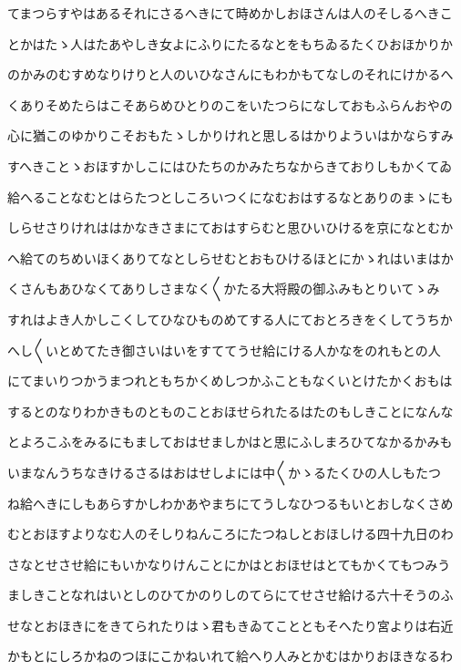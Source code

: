 \documentclass[a4paper,11pt,landscape]{ltjtarticle}
\begin{document}
てまつらすやはあるそれにさるへきにて時めかしおほさんは人のそしるへきこ
\par\medskip
とかはたゝ人はたあやしき女よにふりにたるなとをもちゐるたくひおほかりか
\par\medskip
のかみのむすめなりけりと人のいひなさんにもわかもてなしのそれにけかるへ
\par\medskip
くありそめたらはこそあらめひとりのこをいたつらになしておもふらんおやの
\par\medskip
心に猶このゆかりこそおもたゝしかりけれと思しるはかりよういはかならすみ
\par\medskip
すへきことゝおほすかしこにはひたちのかみたちなからきておりしもかくてゐ
\par\medskip
給へることなむとはらたつとしころいつくになむおはするなとありのまゝにも
\par\medskip
しらせさりけれははかなきさまにておはすらむと思ひいひけるを京になとむか
\par\medskip
へ給てのちめいほくありてなとしらせむとおもひけるほとにかゝれはいまはか
\par\medskip
くさんもあひなくてありしさまなく〱かたる大将殿の御ふみもとりいてゝみ
\par\medskip
すれはよき人かしこくしてひなひものめてする人にておとろきをくしてうちか
\par\medskip
へし〱いとめてたき御さいはいをすててうせ給にける人かなをのれもとの人
\par\medskip
にてまいりつかうまつれともちかくめしつかふこともなくいとけたかくおもは
\par\medskip
するとのなりわかきものとものことおほせられたるはたのもしきことになんな
\par\medskip
とよろこふをみるにもましておはせましかはと思にふしまろひてなかるかみも
\par\medskip
いまなんうちなきけるさるはおはせしよには中〱かゝるたくひの人しもたつ
\par\medskip
ね給へきにしもあらすかしわかあやまちにてうしなひつるもいとおしなくさめ
\par\medskip
むとおほすよりなむ人のそしりねんころにたつねしとおほしける四十九日のわ
\par\medskip
さなとせさせ給にもいかなりけんことにかはとおほせはとてもかくてもつみう
\par\medskip
ましきことなれはいとしのひてかのりしのてらにてせさせ給ける六十そうのふ
\par\medskip
せなとおほきにをきてられたりはゝ君もきゐてことともそへたり宮よりは右近
\par\medskip
かもとにしろかねのつほにこかねいれて給へり人みとかむはかりおほきなるわ
\end{document}
